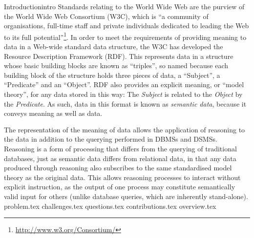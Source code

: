 \begin{nestedsection}{Introduction}{intro}
	Standards relating to the World Wide Web are the purview of the World Wide Web Consortium (W3C), which is ``a community of organisations, full-time staff and private individuals dedicated to leading the Web to its full potential''\footnote{\url{http://www.w3.org/Consortium/}}.
	In order to meet the requirements of providing meaning to data in a Web-wide standard data structure, the W3C has developed the Resource Description Framework (RDF).
	This represents data in a structure whose basic building blocks are known as ``triples'', so named because each building block of the structure holds three pieces of data, a ``Subject'', a ``Predicate'' and an ``Object''.
	RDF also provides an explicit meaning, or ``model theory'', for any data stored in this way:
	The \emph{Subject} is related to the \emph{Object} by the \emph{Predicate}.
	As such, data in this format is known as \emph{semantic data}, because it conveys meaning as well as data.

	The representation of the meaning of data allows the application of reasoning to the data in addition to the querying performed in DBMSs and DSMSs.
	Reasoning is a form of processing that differs from the querying of traditional databases, just as semantic data differs from relational data, in that any data produced through reasoning also subscribes to the same standardised model theory as the original data.
	This allows reasoning processes to interact without explicit instruction, as the output of one process may constitute semantically valid input for others (unlike database queries, which are inherently stand-alone).
	{problem.tex}
	{challenges.tex}
	{questions.tex}
	{contributions.tex}
	{overview.tex}
\end{nestedsection}
